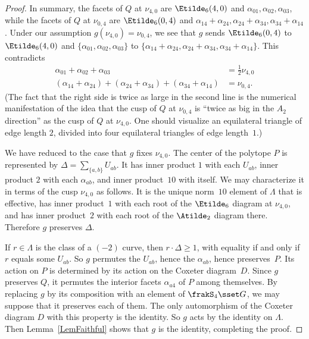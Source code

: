 \begin{proof}
In summary, the facets of $Q$ at $\nu_{4,0}$ are $\Etilde_6(4,0)$ and $\alpha_{01},\alpha_{02},\alpha_{03}$, while the facets of $Q$ at $\nu_{0,4}$ are $\Etilde_6(0,4)$ and $\alpha_{14}+\alpha_{24},
\alpha_{24}+\alpha_{34}, \alpha_{34}+\alpha_{14}$. Under our assumption $g(\nu_{4,0})=\nu_{0,4}$, we see that $g$ sends $\Etilde_6(0,4)$ to $\Etilde_6(4,0)$ and $\{\alpha_{01},\alpha_{02},\alpha_{03}\}$ to $\{\alpha_{14}+\alpha_{24},
\alpha_{24}+\alpha_{34}, \alpha_{34}+\alpha_{14}\}$. This contradicts
\begin{align*}
\alpha_{01}+\alpha_{02}+\alpha_{03}&=\tfrac12\nu_{4,0}\\
(\alpha_{14}+\alpha_{24})+ (\alpha_{24}+\alpha_{34})+ (\alpha_{34}+\alpha_{14})&=\nu_{0,4}.
\end{align*}
(The fact that the right side is twice as large in the second line is the numerical manifestation of the idea that the cusp of $Q$ at $\nu_{0,4}$ is ``twice as big in the $A_2$ direction'' as the cusp of $Q$ at $\nu_{4,0}$. One should visualize an equilateral triangle of edge length $2$, divided into four equilateral triangles of edge length~$1$.)

We have reduced to the case that $g$ fixes $\nu_{4,0}$. The center of the polytope $P$ is represented by $\Delta= \sum_{\{a,b\}}U_{ab}$. It has inner product $1$ with each $U_{ab}$, inner product $2$ with each $\alpha_{ab}$, and inner product~$10$ with itself. We may characterize it in terms of the cusp $\nu_{4,0}$ as follows. It is the unique norm~$10$ element of $\Lambda$ that is effective, has inner product~$1$ with each root of the $\Etilde_6$ diagram at $\nu_{4,0}$, and has inner product~$2$ with each root of the $\Atilde_2$ diagram there. Therefore $g$ preserves $\Delta$.

If $r\in\Lambda$ is the class of a $(-2)$ curve, then $r\cdot\Delta\geq1$, with equality if and only if $r$ equals some $U_{ab}$. So $g$ permutes the $U_{ab}$, hence the $\alpha_{ab}$, hence preserves~$P$. Its action on $P$ is determined by its action on the Coxeter diagram~$D$. Since $g$ preserves $Q$, it permutes the interior facets $\alpha_{a4}$ of $P$ among themselves. By replacing $g$ by its composition with an element of $\frakS_4\sset G$, we may suppose that it preserves each of them. The only automorphism of the Coxeter diagram $D$ with this property is the identity. So $g$ acts by the identity on $\Lambda$. Then Lemma~\ref{LemFaithful} shows that $g$ is the identity, completing the proof.
\end{proof}

